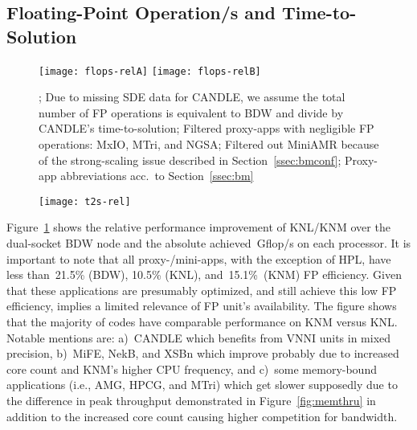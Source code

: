 \subsection{Floating-Point Operation/s and Time-to-Solution}\label{ssec:eval_flops}
%
\begin{figure}[tbp]
    \centering
    \texttt{[image: flops-relA]}
    \texttt{[image: flops-relB]}
    \caption{\label{fig:flops} ; Due to missing SDE data for CANDLE, we assume the total number of FP operations is equivalent to BDW and divide by CANDLE's time-to-solution; Filtered proxy-apps with negligible FP operations: MxIO, MTri, and NGSA; Filtered out MiniAMR because of the strong-scaling issue described in Section~\ref{ssec:bmconf}; Proxy-app abbreviations acc.~to Section~\ref{ssec:bm}}
    \vspace{-0.3em}
\end{figure}
\begin{figure}[tbp]
    \centering
    \texttt{[image: t2s-rel]}
    \caption{\label{fig:t2s-rel} }
    \vspace{-0.9em}
\end{figure}
%
Figure~\ref{fig:flops} shows the relative performance improvement of KNL/KNM over the dual-socket BDW node and the absolute achieved~\unit[]{Gflop/s} on each processor. It is important to note that all proxy-/mini-apps, with the exception of HPL, have less than~21.5\% (BDW), 10.5\% (KNL), and~15.1\%~(KNM) FP efficiency. Given that these applications are presumably optimized, and still achieve this low FP efficiency, implies a limited relevance of FP unit's availability. The figure shows that the majority of codes have comparable performance on KNM versus KNL. Notable mentions are: a)~CANDLE which benefits from VNNI units in mixed precision,
b)~MiFE, NekB, and XSBn which improve probably due to increased core count and KNM's higher CPU frequency,
and c)~some memory-bound applications (i.e., AMG, HPCG, and MTri) which get slower supposedly due to the difference in peak throughput demonstrated in Figure~\ref{fig:memthru} in addition to the increased core count causing higher competition for bandwidth.

